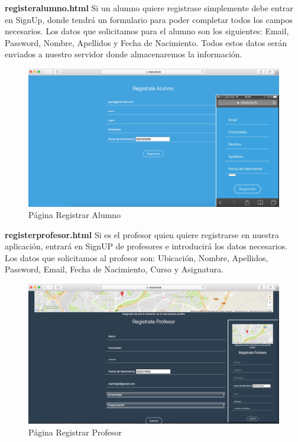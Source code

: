 \textbf{registeralumno.html} Si un alumno quiere registrase simplemente debe entrar en SignUp, donde tendrá un formulario para poder completar todos los campos necesarios. Los datos que solicitamos para el alumno son los siguientes: Email, Password, Nombre, Apellidos y Fecha de Nacimiento. Todos estos datos serán enviados a nuestro servidor donde almacenaremos la información.
\begin{figure}[!h]
    \centering
    \includegraphics[width=140mm]{img/templates/registeralumno.png}
    \caption{Página Registrar Alumno}
      \label{img:signupalumnoclasscity}
\end{figure}

\textbf{registerprofesor.html} Si es el profesor quien quiere registrarse en nuestra aplicación, entrará en SignUP de profesores e introducirá los datos necesarios. Los datos que solicitamos al profesor son: Ubicación, Nombre, Apellidos, Password, Email, Fecha de Nacimiento, Curso y Asignatura.
\begin{figure}[!h]
    \centering
    \includegraphics[width=140mm]{img/templates/registerprofesor.png}
    \caption{Página Registrar Profesor}
    \label{img:signuprofesorclasscity}
\end{figure}

